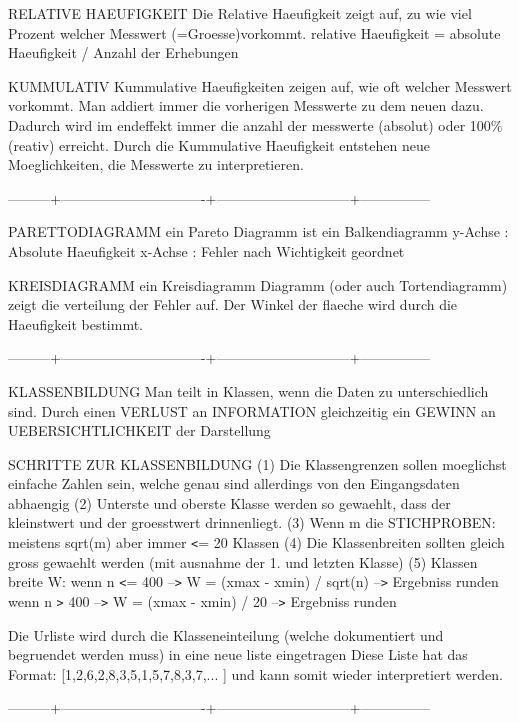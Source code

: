 \documentclass{article}
\begin{document}
RELATIVE HAEUFIGKEIT
    Die Relative Haeufigkeit zeigt auf, zu wie viel Prozent welcher Messwert (=Groesse)vorkommt.
        relative Haeufigkeit = absolute Haeufigkeit / Anzahl der Erhebungen

KUMMULATIV
    Kummulative Haeufigkeiten zeigen auf, wie oft welcher Messwert vorkommt.
    Man addiert immer die vorherigen Messwerte zu dem neuen dazu. 
    Dadurch wird im endeffekt immer die anzahl der messwerte (absolut) oder 100\% (reativ) erreicht.
    Durch die Kummulative Haeufigkeit entstehen neue Moeglichkeiten, die Messwerte zu interpretieren.

---------+-------------------------------+-----------------------------+---------------

PARETTODIAGRAMM
    ein Pareto Diagramm ist ein Balkendiagramm
    y-Achse : Absolute Haeufigkeit
    x-Achse : Fehler nach Wichtigkeit geordnet

KREISDIAGRAMM      
    ein Kreisdiagramm Diagramm (oder auch Tortendiagramm) zeigt die verteilung der Fehler auf.
        Der Winkel der flaeche wird durch die Haeufigkeit bestimmt.

---------+-------------------------------+-----------------------------+---------------

KLASSENBILDUNG
   Man teilt in Klassen, wenn die Daten zu unterschiedlich sind. 
   Durch einen VERLUST an INFORMATION gleichzeitig ein GEWINN an UEBERSICHTLICHKEIT der Darstellung

    SCHRITTE ZUR KLASSENBILDUNG
        (1) Die Klassengrenzen sollen moeglichst einfache Zahlen sein, welche genau sind allerdings von den Eingangsdaten abhaengig
        (2) Unterste und oberste Klasse werden so gewaehlt, dass der kleinstwert und der groesstwert drinnenliegt.
        (3) Wenn m die STICHPROBEN: meistens sqrt(m) aber immer \verb|<|= 20 Klassen
        (4) Die Klassenbreiten sollten gleich gross gewaehlt werden (mit ausnahme der 1. und letzten Klasse)
        (5) Klassen breite W:   wenn n \verb|<|= 400 --\verb|>| W = (xmax - xmin) / sqrt(n) --\verb|>| Ergebniss runden
                                wenn n \verb|>| 400 --\verb|>| W = (xmax - xmin) / 20 --\verb|>| Ergebniss runden

    Die Urliste wird durch die Klasseneinteilung (welche dokumentiert und begruendet werden muss) in eine neue liste eingetragen
    Diese Liste hat das Format: [1,2,6,2,8,3,5,1,5,7,8,3,7,... ] und kann somit wieder interpretiert werden.

---------+-------------------------------+-----------------------------+---------------
\end{document}
